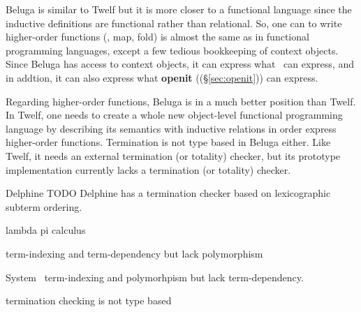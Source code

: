 Beluga \cite{Pie10} is similar to Twelf but it is more closer to
a functional language since the inductive definitions are functional
rather than relational. So, one can to write higher-order functions
(\eg, map, fold) is almost the same as in functional programming languages,
except a few tedious bookkeeping of context objects. Since Beluga has access
to context objects, it can express what \MsfIt\ can express, and in addtion,
it can also express what \textbf{openit} ((\S\ref{sec:openit})) can express.

Regarding higher-order functions, Beluga is in a much better position
than Twelf. In Twelf, one needs to create a whole new object-level
functional programming language by describing its semantics with
inductive relations in order express higher-order functions.
Termination is not type based in Beluga either. Like Twelf, it needs
an external termination (or totality) checker, but its prototype
implementation currently lacks a termination (or totality) checker.

Delphine \cite{pos08phd} TODO
Delphine has a termination checker based on lexicographic subterm ordering.

lambda pi calculus

term-indexing and term-dependency 
but lack polymorphism

System \Fi\
term-indexing and polymorhpism
but lack term-dependency.


termination checking is not type based


